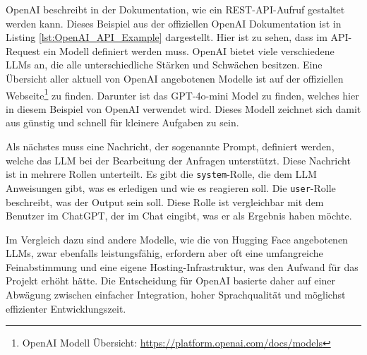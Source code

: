 OpenAI beschreibt in der Dokumentation, wie ein REST-\ac{API}-Aufruf gestaltet werden kann. Dieses Beispiel aus der offiziellen OpenAI Dokumentation ist in Listing \ref{lst:OpenAI_API_Example} dargestellt. Hier ist zu sehen, dass im \ac{API}-Request ein Modell definiert werden muss. OpenAI bietet viele verschiedene \ac{LLM}s an, die alle unterschiedliche Stärken und Schwächen besitzen. Eine Übersicht aller aktuell von OpenAI angebotenen Modelle ist auf der offiziellen Webseite\footnote[1]{OpenAI Modell Übersicht: \href{https://platform.openai.com/docs/models}{https://platform.openai.com/docs/models}} zu finden. Darunter ist das \ac{GPT}-4o-mini Model zu finden, welches hier in diesem Beispiel von OpenAI verwendet wird. Dieses Modell zeichnet sich damit aus günstig und schnell für kleinere Aufgaben zu sein. 


Als nächstes muss eine Nachricht, der sogenannte Prompt, definiert werden, welche das \ac{LLM} bei der Bearbeitung der Anfragen unterstützt. Diese Nachricht ist in mehrere Rollen unterteilt. Es gibt die \texttt{system}-Rolle, die dem \ac{LLM} Anweisungen gibt, was es erledigen und wie es reagieren soll. Die \texttt{user}-Rolle beschreibt, was der Output sein soll. Diese Rolle ist vergleichbar mit dem Benutzer im Chat\ac{GPT}, der im Chat eingibt, was er als Ergebnis haben möchte. \cite{openai_quickstart}

Im Vergleich dazu sind andere Modelle, wie die von Hugging Face angebotenen \ac{LLM}s, zwar ebenfalls leistungsfähig, erfordern aber oft eine umfangreiche Feinabstimmung und eine eigene Hosting-Infrastruktur, was den Aufwand für das Projekt erhöht hätte. Die Entscheidung für OpenAI basierte daher auf einer Abwägung zwischen einfacher Integration, hoher Sprachqualität und möglichst effizienter Entwicklungszeit.


